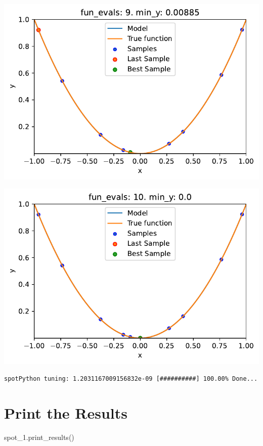 \documentclass[
  letterpaper,
  DIV=11,
  numbers=noendperiod]{scrreprt}
\newenvironment{Shaded}{\begin{snugshade}}{\end{snugshade}}
\newcommand{\NormalTok}[1]{\textcolor[rgb]{0.00,0.23,0.31}{#1}}
\begin{document}
\includegraphics{007_num_spot_intro_files/figure-pdf/cell-9-output-1.pdf}

\includegraphics{007_num_spot_intro_files/figure-pdf/cell-9-output-2.pdf}

\begin{verbatim}
spotPython tuning: 1.2031167009156832e-09 [##########] 100.00% Done...
\end{verbatim}

\section{Print the Results}\label{print-the-results-1}

\begin{Shaded}
\begin{Highlighting}[]
\NormalTok{spot\_1.print\_results()}
\end{Highlighting}
\end{Shaded}
\end{document}
